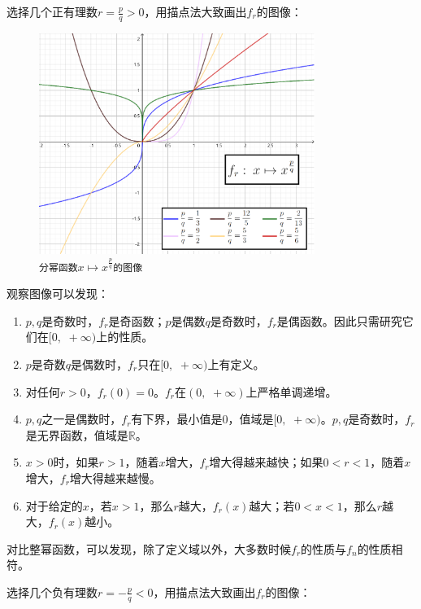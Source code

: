 \documentclass[12pt,UTF8]{ctexbook}
\begin{document}
选择几个正有理数$r = \frac{p}{q} > 0$，用描点法大致画出$f_r$的图像：

\begin{figure}[h]
    \vspace{4pt}
    \centering
    \includegraphics[width=0.8\textwidth]{分幂函数2.png}
    \caption*{\texttt{分幂函数}$x\mapsto x^\frac{p}{q}$\texttt{的图像}}
\end{figure}

观察图像可以发现：
\begin{enumerate}
    \item $p, q$是奇数时，$f_r$是奇函数；$p$是偶数$q$是奇数时，$f_r$是偶函数。因此只需研究它们在$[0, \,\, +\infty)$上的性质。
    \item $p$是奇数$q$是偶数时，$f_r$只在$[0,\,\,  +\infty)$上有定义。
    \item 对任何$r > 0$，$f_r(0) = 0$。$f_r$在$(0, \,\, +\infty)$上严格单调递增。
    \item $p, q$之一是偶数时，$f_r$有下界，最小值是$0$，值域是$[0, \,\, +\infty)$。$p, q$是奇数时，$f_r$是无界函数，值域是$\mathbb{R}$。
    \item $x>0$时，如果$r>1$，随着$x$增大，$f_r$增大得越来越快；如果$0 < r < 1$，随着$x$增大，$f_r$增大得越来越慢。
    \item 对于给定的$x$，若$x>1$，那么$r$越大，$f_r(x)$越大；若$0 < x<1$，那么$r$越大，$f_r(x)$越小。
\end{enumerate}
对比整幂函数，可以发现，除了定义域以外，大多数时候$f_r$的性质与$f_n$的性质相符。

选择几个负有理数$r = -\frac{p}{q} < 0$，用描点法大致画出$f_r$的图像：
\end{document}
